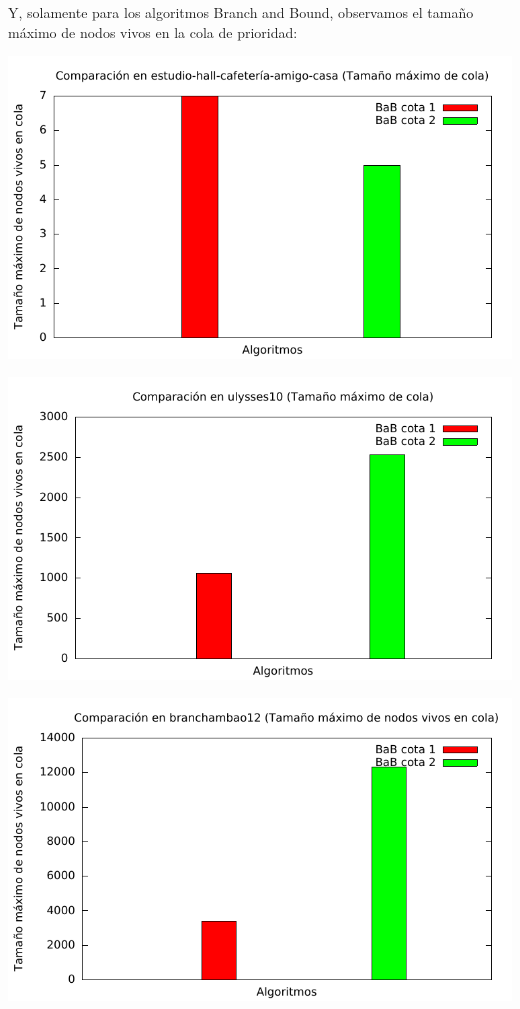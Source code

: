 Y, solamente para los algoritmos Branch and Bound, observamos el tamaño máximo de nodos vivos en la cola de prioridad:

\includegraphics[width=15cm]{img/barras_e-h-c-a-c5_cola}

\includegraphics[width=15cm]{img/barras_ulysses10_cola}

\includegraphics[width=15cm]{img/barras_branchambao12_cola}